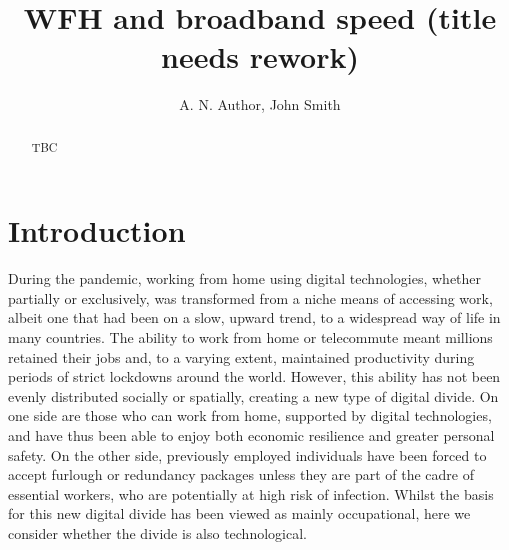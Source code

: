 \documentclass[,]{sagej}
\begin{document}
\title{WFH and broadband speed (title needs rework)}

\runninghead{}

\author{A. N. Author\affilnum{}, John Smith\affilnum{}}

\affiliation{}



\begin{abstract}
TBC
\end{abstract}


\maketitle

\hypertarget{sec:1}{%
\section{Introduction}\label{sec:1}}

During the pandemic, working from home using digital technologies,
whether partially or exclusively, was transformed from a niche means of
accessing work, albeit one that had been on a slow, upward trend, to a
widespread way of life in many countries. The ability to work from home
or telecommute meant millions retained their jobs and, to a varying
extent, maintained productivity during periods of strict lockdowns
around the world. However, this ability has not been evenly distributed
socially or spatially, creating a new type of digital divide. On one
side are those who can work from home, supported by digital
technologies, and have thus been able to enjoy both economic resilience
and greater personal safety. On the other side, previously employed
individuals have been forced to accept furlough or redundancy packages
unless they are part of the cadre of essential workers, who are
potentially at high risk of infection. Whilst the basis for this new
digital divide has been viewed as mainly occupational, here we consider
whether the divide is also technological.
\end{document}
